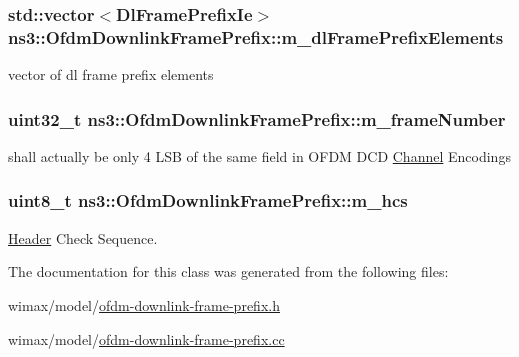 \subsubsection[{\texorpdfstring{m\+\_\+dl\+Frame\+Prefix\+Elements}{m_dlFramePrefixElements}}]{\setlength{\rightskip}{0pt plus 5cm}std\+::vector$<${\bf Dl\+Frame\+Prefix\+Ie}$>$ ns3\+::\+Ofdm\+Downlink\+Frame\+Prefix\+::m\+\_\+dl\+Frame\+Prefix\+Elements\hspace{0.3cm}{\ttfamily [private]}}\hypertarget{classns3_1_1OfdmDownlinkFramePrefix_a5556a09adf1ba07c0ff0d024c163ea8e}{}\label{classns3_1_1OfdmDownlinkFramePrefix_a5556a09adf1ba07c0ff0d024c163ea8e}


vector of dl frame prefix elements 

\subsubsection[{\texorpdfstring{m\+\_\+frame\+Number}{m_frameNumber}}]{\setlength{\rightskip}{0pt plus 5cm}uint32\+\_\+t ns3\+::\+Ofdm\+Downlink\+Frame\+Prefix\+::m\+\_\+frame\+Number\hspace{0.3cm}{\ttfamily [private]}}\hypertarget{classns3_1_1OfdmDownlinkFramePrefix_a000a256bcb20f919dae6c434205f7c6d}{}\label{classns3_1_1OfdmDownlinkFramePrefix_a000a256bcb20f919dae6c434205f7c6d}


shall actually be only 4 L\+SB of the same field in O\+F\+DM D\+CD \hyperlink{classns3_1_1Channel}{Channel} Encodings 

\subsubsection[{\texorpdfstring{m\+\_\+hcs}{m_hcs}}]{\setlength{\rightskip}{0pt plus 5cm}uint8\+\_\+t ns3\+::\+Ofdm\+Downlink\+Frame\+Prefix\+::m\+\_\+hcs\hspace{0.3cm}{\ttfamily [private]}}\hypertarget{classns3_1_1OfdmDownlinkFramePrefix_a886434776ca438227fbb61411b289f2a}{}\label{classns3_1_1OfdmDownlinkFramePrefix_a886434776ca438227fbb61411b289f2a}


\hyperlink{classns3_1_1Header}{Header} Check Sequence. 



The documentation for this class was generated from the following files\+:\begin{DoxyCompactItemize}
\item 
wimax/model/\hyperlink{ofdm-downlink-frame-prefix_8h}{ofdm-\/downlink-\/frame-\/prefix.\+h}\item 
wimax/model/\hyperlink{ofdm-downlink-frame-prefix_8cc}{ofdm-\/downlink-\/frame-\/prefix.\+cc}\end{DoxyCompactItemize}
